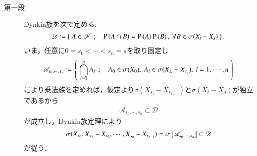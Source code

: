 \begin{prf}\mbox{}
	\begin{description}
		\item[第一段]
			Dynkin族を次で定める:
			\begin{align}
				\mathscr{D} \coloneqq
				\left\{\ A \in \mathscr{F}\ \, ; \quad \operatorname{P} \left(A \cap B\right) = \operatorname{P} \left(A\right)\operatorname{P} \left(B\right),\ \forall B \in \sigma(X_t - X_s)\ \right\}.
			\end{align}
			いま，任意に$0 = s_0 < \cdots < s_n = s$を取り固定し
			\begin{align}
				\mathscr{A}_{s_0, \cdots, s_n} \coloneqq
				\left\{\ \bigcap_{i=0}^n A_i\ \, ; \quad A_0 \in \sigma(X_0),\ A_i \in \sigma(X_{s_i} - X_{s_j}),\ i=1,\cdots,n\ \right\}
			\end{align}
			により乗法族を定めれば，仮定より$\sigma(X_{s_i} - X_{s_{i-1}})$と$\sigma(X_t - X_s)$が独立であるから
			\begin{align}
				\mathscr{A}_{s_0, \cdots, s_n}
				\subset \mathscr{D}
			\end{align}
			が成立し，Dynkin族定理により
			\begin{align}
				\sigma(X_{s_0},X_{s_1}-X_{s_0},\cdots,X_{s_n} - X_{s_{n-1}})
				= \sigma \left[\mathscr{A}_{s_0, \cdots, s_n}\right]
				\subset \mathscr{D}
				\label{eq:thm_application_dynkin_system_theorem_to_independence_2}
			\end{align}
			が従う．
		

\end{description}
\end{prf}
